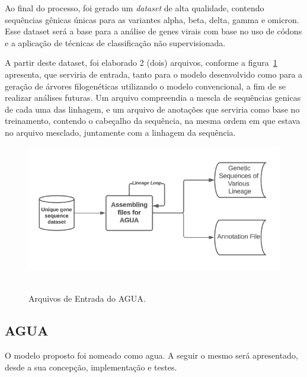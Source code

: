 Ao final do processo, foi gerado um \textit{dataset} de alta qualidade, contendo sequências gênicas únicas para as variantes alpha, beta, delta, gamma e omicron. Esse dataset será a base para a análise de genes virais com base no uso de códons e a aplicação de técnicas de classificação não supervisionada.

A partir deste dataset, foi elaborado 2 (dois) arquivos, conforme a figura~\ref{fig:inputAgua} apresenta, que serviria de entrada, tanto para o modelo desenvolvido como para a geração de árvores filogenéticas utilizando o modelo convencional, a fim de se realizar análises futuras. Um arquivo compreendia a mescla de sequências genicas de cada uma das linhagem, e um arquivo de anotações que serviria como base no treinamento, contendo o cabeçalho da sequência, na mesma ordem em que estava no arquivo mesclado, juntamente com a linhagem da sequência.

\begin{figure}[htb]
  \centering
  \caption{Arquivos de Entrada do AGUA.}
  \includegraphics[scale=0.45]{figuras/pipelines/input_AGUA.png}
  ~\label{fig:inputAgua}
\end{figure}

\subsection{AGUA}
O modelo proposto foi nomeado como \gls{agua}. A seguir o mesmo será apresentado, desde a sua concepção, implementação e testes.

